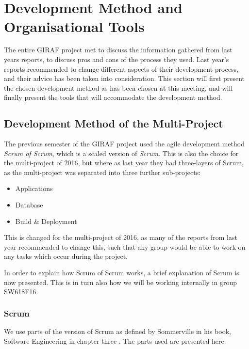 \section{Development Method and Organisational Tools}
The entire GIRAF project met to discuss the information gathered from last years reports, to discuss pros and cons of the process they used.
Last year's reports recommended to change different aspects of their development process, and their advice has been taken into consideration.
This section will first present the chosen development method as has been chosen at this meeting, and will finally present the tools that will accommodate the development method.


\subsection*{Development Method of the Multi-Project}
The previous semester of the GIRAF project used the agile development method \textit{Scrum of Scrum}, which is a scaled version of \textit{Scrum}.
This is also the choice for the multi-project of 2016, but where as last year they had three-layers of Scrum, as the multi-project was separated into three further sub-projects:
\begin{itemize}
	\item Applications
	\item Database
	\item Build \& Deployment
\end{itemize}

This is changed for the multi-project of 2016, as many of the reports from last year recommended to change this, such that any group would be able to work on any tasks which occur during the project. 

In order to explain how Scrum of Scrum works, a brief explanation of Scrum is now presented.
This is in turn also how we will be working internally in group SW618F16. 


\subsubsection*{Scrum}\label{scrum}

We use parts of the version of Scrum as defined by Sommerville in his book, Software Engineering in chapter three \cite{SEBOOK}.
The parts used are presented here.

